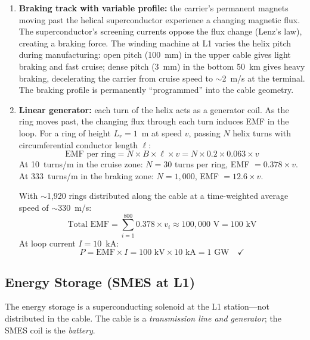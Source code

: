 \documentclass[12pt,letterpaper]{article}
\begin{document}
\begin{enumerate}[label=(\roman*)]
\item \textbf{Braking track with variable profile:} the carrier's permanent magnets moving past the helical superconductor experience a changing magnetic flux. The superconductor's screening currents oppose the flux change (Lenz's law), creating a braking force. The winding machine at L1 varies the helix pitch during manufacturing: open pitch (100~mm) in the upper cable gives light braking and fast cruise; dense pitch (3~mm) in the bottom 50~km gives heavy braking, decelerating the carrier from cruise speed to $\sim$2~m/s at the terminal. The braking profile is permanently ``programmed'' into the cable geometry.

\item \textbf{Linear generator:} each turn of the helix acts as a generator coil. As the ring moves past, the changing flux through each turn induces EMF in the loop. For a ring of height $L_r = 1$~m at speed $v$, passing $N$ helix turns with circumferential conductor length $\ell$:
\begin{equation}
\text{EMF per ring} = N \times B \times \ell \times v = N \times 0.2 \times 0.063 \times v
\end{equation}
At 10~turns/m in the cruise zone: $N = 30$ turns per ring, EMF $= 0.378 \times v$. At 333~turns/m in the braking zone: $N = 1{,}000$, EMF $= 12.6 \times v$.

With $\sim$1{,}920 rings distributed along the cable at a time-weighted average speed of $\sim$330~m/s:
\begin{equation}
\text{Total EMF} = \sum_{i=1}^{800} 0.378 \times v_i \approx 100{,}000 \text{~V} = 100 \text{~kV}
\end{equation}
At loop current $I = 10$~kA:
\begin{equation}
P = \text{EMF} \times I = 100 \text{~kV} \times 10 \text{~kA} = 1 \text{~GW} \quad \checkmark
\end{equation}
\end{enumerate}

\subsection{Energy Storage (SMES at L1)}

The energy storage is a superconducting solenoid at the L1 station---not distributed in the cable. The cable is a \emph{transmission line and generator}; the SMES coil is the \emph{battery}.
\end{document}
